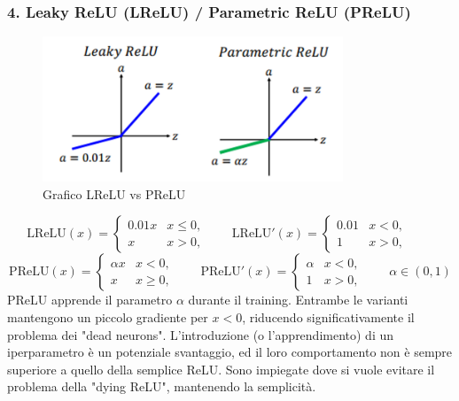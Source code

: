 \documentclass[a4paper,12pt]{report}
\begin{document}
	\subsubsection{4. Leaky ReLU (LReLU) / Parametric ReLU (PReLU)}
	\begin{figure}[H]
		\centering
		\includegraphics[width=0.8\textwidth]{img/lprelu.png}
		\caption{Grafico LReLU vs PReLU}
	\end{figure}
	\[
	\mathrm{LReLU}(x)=\begin{cases}0.01x & x\le0,\\ x & x>0,\end{cases}\qquad
	\mathrm{LReLU}'(x)=\begin{cases}0.01 & x<0,\\ 1 & x>0,\end{cases}\qquad
	\]
	\[
	\mathrm{PReLU}(x)=\begin{cases}\alpha x & x<0,\\ x & x\ge0,\end{cases}\qquad
	\mathrm{PReLU}'(x)=\begin{cases}\alpha & x<0,\\ 1 & x>0,\end{cases}\qquad \alpha\in(0,1)
	\]
	PReLU apprende il parametro $\alpha$ durante il training. Entrambe le varianti mantengono un piccolo gradiente per $x<0$, riducendo significativamente il problema dei "dead neurons". L'introduzione (o l'apprendimento) di un iperparametro è un potenziale svantaggio, ed il loro comportamento non è sempre superiore a quello della semplice ReLU. Sono impiegate dove si vuole evitare il problema della "dying ReLU", mantenendo la semplicità.
	
\end{document}
